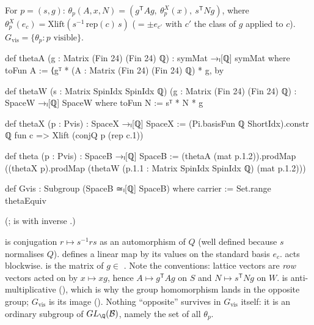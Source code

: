\begin{definition}\label{ch21:def:Gvis}
For $p=(s,g)$: $\theta_p(A,x,N)=(g^{\mathsf T}Ag,\ \theta^X_p(x),\ s^{\mathsf T}Ng)$, where
$\theta^X_p(e_c)=\mathrm{Xlift}(s^{-1}\,\mathrm{rep}(c)\,s)$ ($=\pm e_{c'}$ with $c'$ the class of
$g$ applied to $c$).  $G_{\mathrm{vis}}=\{\theta_p:p\text{ visible}\}$.
\end{definition}
\begin{leancode}
def thetaA (g : Matrix (Fin 24) (Fin 24) ℚ) : symMat →ₗ[ℚ] symMat where
  toFun A := ⟨gᵀ * (A : Matrix (Fin 24) (Fin 24) ℚ) * g, by
\end{leancode}
\begin{leancode}
def thetaW (s : Matrix SpinIdx SpinIdx ℚ) (g : Matrix (Fin 24) (Fin 24) ℚ) :
    SpaceW →ₗ[ℚ] SpaceW where
  toFun N := sᵀ * N * g
\end{leancode}
\begin{leancode}
def thetaX (p : Pvis) : SpaceX →ₗ[ℚ] SpaceX :=
  (Pi.basisFun ℚ ShortIdx).constr ℚ fun c => Xlift (conjQ p (rep c.1))
\end{leancode}
\begin{leancode}
def theta (p : Pvis) : SpaceB →ₗ[ℚ] SpaceB :=
  (thetaA (mat p.1.2)).prodMap
    ((thetaX p).prodMap (thetaW (p.1.1 : Matrix SpinIdx SpinIdx ℚ) (mat p.1.2)))
\end{leancode}
\begin{leancode}
def Gvis : Subgroup (SpaceB ≃ₗ[ℚ] SpaceB) where
  carrier := Set.range thetaEquiv
\end{leancode}
(;  is  with
inverse .)
\begin{dictionary}
 is conjugation $r\mapsto s^{-1}rs$ as an automorphism of $Q$ (well defined because $s$
normalises $Q$).   defines a linear map by its values on the standard basis
$e_c$.   acts blockwise.   is the matrix of $g\in$ .
Note the conventions: lattice vectors are \emph{row} vectors acted on by $x\mapsto xg$, hence
$A\mapsto g^{\mathsf T}Ag$ on $S$ and $N\mapsto s^{\mathsf T}Ng$ on $W$.   is
anti-multiplicative (), which
is why the group homomorphism  lands in the opposite group; $G_{\mathrm{vis}}$ is its
image ().  Nothing ``opposite'' survives in $G_{\mathrm{vis}}$ itself: it
is an ordinary subgroup of $GL_\Q(\chXXIB)$, namely the set of all $\theta_p$.
\end{dictionary}

